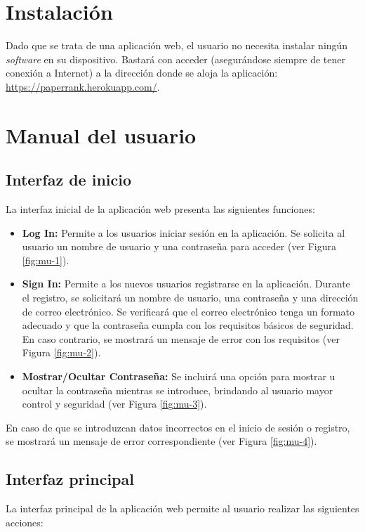 \section{Instalación}
Dado que se trata de una aplicación web, el usuario no necesita instalar ningún \textit{software} en su dispositivo. Bastará con acceder (asegurándose siempre de tener conexión a Internet) a la dirección donde se aloja la aplicación: \url{https://paperrank.herokuapp.com/}.

\section{Manual del usuario}


\subsection{Interfaz de inicio}
La interfaz inicial de la aplicación web presenta las siguientes funciones:

\begin{itemize}
\item \textbf{Log In:} Permite a los usuarios iniciar sesión en la aplicación. Se solicita al usuario un nombre de usuario y una contraseña para acceder (ver Figura \ref{fig:mu-1}).
\item \textbf{Sign In:} Permite a los nuevos usuarios registrarse en la aplicación. Durante el registro, se solicitará un nombre de usuario, una contraseña y una dirección de correo electrónico. Se verificará que el correo electrónico tenga un formato adecuado y que la contraseña cumpla con los requisitos básicos de seguridad. En caso contrario, se mostrará un mensaje de error con los requisitos (ver Figura \ref{fig:mu-2}).
\item \textbf{Mostrar/Ocultar Contraseña:} Se incluirá una opción para mostrar u ocultar la contraseña mientras se introduce, brindando al usuario mayor control y seguridad (ver Figura \ref{fig:mu-3}).
\end{itemize}

En caso de que se introduzcan datos incorrectos en el inicio de sesión o registro, se mostrará un mensaje de error correspondiente (ver Figura \ref{fig:mu-4}).



\subsection{Interfaz principal}
La interfaz principal de la aplicación web permite al usuario realizar las siguientes acciones:

